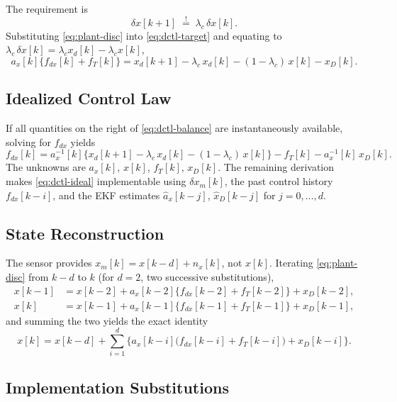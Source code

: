 \documentclass[11pt,a4paper]{ctexart}
\newcommand{\lc}{\lambda_c}
\newcommand{\fdx}{f_{dx}}
\newcommand{\fT}{f_T}
\newcommand{\dx}{\delta x}
\newcommand{\dxm}{\delta x_m}
\newcommand{\xD}{x_D}
\newcommand{\ax}{a_x}
\newcommand{\axhat}{\hat a_x}
\newcommand{\xDhat}{\hat x_D}
\begin{document}
The requirement is
\begin{equation}
\dx[k{+}1] \;\overset{!}{=}\; \lc\,\dx[k].
\label{eq:dctl-target}
\end{equation}
Substituting \eqref{eq:plant-disc} into \eqref{eq:dctl-target} and equating to $\lc\,\dx[k] = \lc x_d[k] - \lc x[k]$,
\begin{equation}
\ax[k]\bigl\{\fdx[k]+\fT[k]\bigr\}
   = x_d[k{+}1] - \lc\,x_d[k] - (1{-}\lc)\,x[k] - \xD[k].
\label{eq:dctl-balance}
\end{equation}

\subsection{Idealized Control Law}

If all quantities on the right of \eqref{eq:dctl-balance} are instantaneously available, solving for $\fdx$ yields
\begin{equation}
\fdx[k] = \ax^{-1}[k]\bigl\{x_d[k{+}1] - \lc\,x_d[k] - (1{-}\lc)\,x[k]\bigr\}
         - \fT[k] - \ax^{-1}[k]\,\xD[k].
\label{eq:dctl-ideal}
\end{equation}
The unknowns are $\ax[k]$, $x[k]$, $\fT[k]$, $\xD[k]$. The remaining derivation makes \eqref{eq:dctl-ideal} implementable using $\dxm[k]$, the past control history $\fdx[k{-}i]$, and the EKF estimates $\axhat[k{-}j]$, $\xDhat[k{-}j]$ for $j=0,\ldots,d$.

\subsection{State Reconstruction}

The sensor provides $x_m[k] = x[k{-}d] + n_x[k]$, not $x[k]$. Iterating \eqref{eq:plant-disc} from $k{-}d$ to $k$ (for $d=2$, two successive substitutions),
\begin{align}
x[k{-}1] &= x[k{-}2] + \ax[k{-}2]\{\fdx[k{-}2]+\fT[k{-}2]\} + \xD[k{-}2], \\
x[k]     &= x[k{-}1] + \ax[k{-}1]\{\fdx[k{-}1]+\fT[k{-}1]\} + \xD[k{-}1],
\end{align}
and summing the two yields the exact identity
\begin{equation}
x[k] = x[k{-}d] + \sum_{i=1}^{d}\!\bigl\{\ax[k{-}i]\bigl(\fdx[k{-}i]+\fT[k{-}i]\bigr) + \xD[k{-}i]\bigr\}.
\label{eq:tele-x}
\end{equation}

\subsection{Implementation Substitutions}
\end{document}
